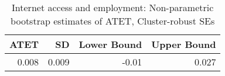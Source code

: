 \begin{table}[!h]
\centering
\caption{\label{tab:tab:np_atet_clustered}Internet access and employment: Non-parametric bootstrap estimates of ATET, Cluster-robust SEs}
\centering
\begin{tabular}[t]{rrrr}
\toprule
ATET & SD & Lower Bound & Upper Bound\\
\midrule
0.008 & 0.009 & -0.01 & 0.027\\
\bottomrule
\end{tabular}
\end{table}
